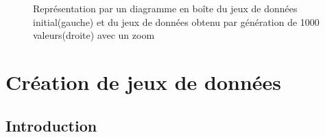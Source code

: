 \documentclass[a4paper]{article}
\begin{document}
\begin{figure}[H]
\hfill
{}
\caption{Représentation par un diagramme en boîte du jeux de données initial(gauche) et du jeux de données obtenu par génération de 1000 valeurs(droite) avec un zoom }\label{fig:somefiglabel}
\end{figure}




\newpage
\section{Création de jeux de données}

\subsection{Introduction}
\end{document}
